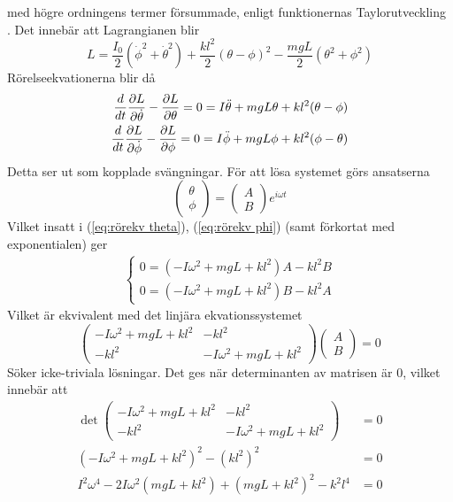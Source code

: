 med högre ordningens termer försummade, enligt funktionernas Taylorutveckling \cite{nordling_physics_2021}. Det innebär att Lagrangianen blir \begin{equation}
    L = \frac{I_0}{2}(\dot{\phi}^2+\dot{\theta}^2)+ \frac{kl^2}{2}(\theta-\phi)^2-\frac{mgL}{2}(\theta^2+\phi^2)
\end{equation}
Rörelseekvationerna blir då \begin{align}
    \frac{d}{dt}\frac{\partial L}{\partial \dot{\theta}}-\frac{\partial L}{\partial \theta} = 0 = I\ddot{\theta}+mgL\theta+kl^2(\theta-\phi) \label{eq:rörekv theta}\\
    \frac{d}{dt}\frac{\partial L}{\partial \dot{\phi}}-\frac{\partial L}{\partial \phi} = 0 = I\ddot{\phi}+mgL\phi+kl^2(\phi-\theta) \label{eq:rörekv phi}
\end{align}
Detta ser ut som kopplade svängningar. För att lösa systemet görs ansatserna \begin{equation}
    \begin{pmatrix}
        \theta\\\phi
    \end{pmatrix} = \begin{pmatrix}
        A\\B
    \end{pmatrix}e^{i\omega t}
\end{equation}
Vilket insatt i (\ref{eq:rörekv theta}), (\ref{eq:rörekv phi}) (samt förkortat med exponentialen) ger \begin{align}
    \begin{cases}
        0 = (-I\omega^2+mgL+kl^2)A-{kl^2}B \\
        0 = (-I\omega^2+mgL+kl^2)B-{kl^2}A
    \end{cases}
    \label{eq:rörelse efter ansats}
\end{align}
Vilket är ekvivalent med det linjära ekvationssystemet \begin{equation}
    \begin{pmatrix}
        -I\omega^2+mgL+kl^2 & -kl^2 \\
        -kl^2  &-I\omega^2+mgL+kl^2 
    \end{pmatrix} \begin{pmatrix}
        A\\B
    \end{pmatrix} = 0
\end{equation}
Söker icke-triviala lösningar. Det ges när determinanten av matrisen är 0, vilket innebär att \begin{align}
    \det \begin{pmatrix}
        -I\omega^2+mgL+kl^2 & -kl^2 \\
        -kl^2  &-I\omega^2+mgL+kl^2 
    \end{pmatrix} &= 0 \\
    (-I\omega^2+mgL+kl^2)^2-(kl^2)^2 &= 0\\
    I^2\omega^4-2I\omega^2(mgL+kl^2)+(mgL+kl^2)^2-k^2l^4 &=0\\
\end{align}
